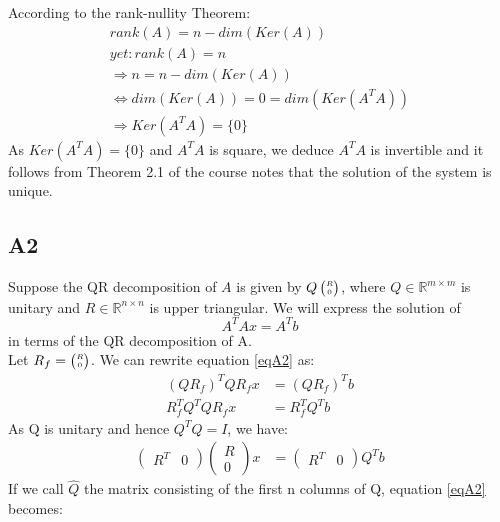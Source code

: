 \documentclass[11pt]{article}
\newcommand{\real}{\mathbb{R}} %
\begin{document}
According to the rank-nullity Theorem: \\
\begin{align*}
    rank(A) = n - dim(Ker(A)) \\
    yet: rank(A) = n \\
    \Rightarrow n = n - dim(Ker(A)) \\
    \Leftrightarrow dim(Ker(A))= 0 = dim(Ker(A^{T}A)) \\
    \Rightarrow Ker(A^{T}A) = \{ 0 \}
\end{align*}
As $Ker(A^{T}A)=\{ 0\}$ and $A^{T}A$ is square, we deduce $A^{T}A$ is invertible and it follows from Theorem 2.1 of the course notes that the solution of the system is unique.

\subsection*{A2}
Suppose the QR decomposition of $A$ is given by $\tiny{Q \begin{pmatrix}R\\0\end{pmatrix}}$, where $Q \in \real^{m\times m}$ is unitary and $R \in \real^{n\times n}$ is upper triangular. We will express the solution of 
\begin{equation}\label{eqA2}
    A^T Ax=A^T b
\end{equation} in terms of the QR decomposition of A.\\
Let $\tiny{R_f=\begin{pmatrix}R\\0\end{pmatrix}}$. We can rewrite equation \eqref{eqA2} as:
\begin{align*}
    (QR_f)^{T}QR_fx &= (QR_f)^Tb\\
    R_f^{T}Q^{T}QR_fx &= R_f^{T}Q^Tb
\end{align*}
As Q is unitary and hence $Q^TQ=I$, we have:
\begin{align*}
    \begin{pmatrix}
    R^T & 0
    \end{pmatrix}
    \begin{pmatrix}
    R\\ 0
    \end{pmatrix}x
    &=\begin{pmatrix}
    R^T & 0
    \end{pmatrix}
    Q^Tb
\end{align*}
If we call $\hat{Q}$ the matrix consisting of the first n columns of Q, equation \eqref{eqA2} becomes:
\end{document}
